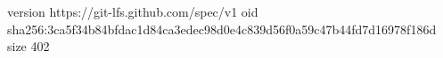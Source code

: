 version https://git-lfs.github.com/spec/v1
oid sha256:3ca5f34b84bfdac1d84ca3edec98d0e4c839d56f0a59c47b44fd7d16978f186d
size 402
